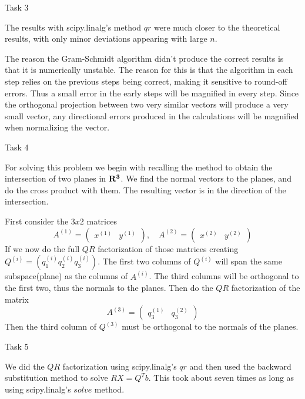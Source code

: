 \documentclass[a4paper]{article}
\begin{document}
\begin{description}
\item{Task 3}

The results with scipy.linalg's method $qr$ were much closer to the theoretical results, with only minor deviations appearing with large $n$.

The reason the Gram-Schmidt algorithm didn't produce the correct results is that it is numerically unstable. The reason for this is that the algorithm in each step relies on the previous steps being correct, making it sensitive to round-off errors. Thus a small error in the early steps will be magnified in every step. Since the orthogonal projection between two very similar vectors will produce a very small vector, any directional errors produced in the calculations will be magnified when normalizing the vector.
 
\item{Task 4}

For solving this problem we begin with recalling the method to obtain the intersection of two planes in $\bf{R^3}$. We find the normal vectors to the planes, and do the cross product with them. The resulting vector is in the direction of the intersection.

First consider the $3 x 2$ matrices
\begin{equation}
A^{(1)} = 
\begin{pmatrix}
x^{(1)} & y^{(1)}
\end{pmatrix}
,\quad
A^{(2)} =
\begin{pmatrix}
x^{(2)} & y^{(2)}
\end{pmatrix}
\end{equation}
If we now do the full $QR$ factorization of those matrices creating $Q^{(i)}=(q_1^{(i)} q_2^{(i)} q_3^{(i)})$. The first two columns of $Q^{(i)}$ will span the same subspace(plane) as the columns of $A^{(i)}$. The third columns will be orthogonal to the first two, thus the normals to the planes. Then do the $QR$ factorization of the matrix
\begin{equation}
A^{(3)} =
\begin{pmatrix}
q_3^{(1)} & q_3^{(2)}
\end{pmatrix}
\end{equation}
Then the third column of $Q^{(3)}$ must be orthogonal to the normals of the planes.

\item{Task 5}

We did the $QR$ factorization using scipy.linalg's $qr$ and then used the backward substitution method to solve $RX = Q^Tb$. This took about seven times as long as using scipy.linalg's $solve$ method.


\end{description}
\end{document}
